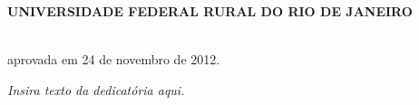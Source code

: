 \documentclass[
	12pt,				%
	openany,			%
	twoside,			%
	a4paper,			%
	chapter=TITLE,		%
	english,			%
	brazil				%
	]{abntex2}
\begin{document}
%
% 
%
\begin{folhadeaprovacao}
    
    \noindent \textbf{UNIVERSIDADE FEDERAL RURAL DO RIO DE JANEIRO \\
    \MakeTextUppercase{\imprimirinstituto} \\
    \MakeTextUppercase{\imprimirprogramapg}}

    \vfill
      
    \begin{center}
        \textbf{\MakeTextUppercase{\imprimirautor}}
    \end{center}

    \vfill
    
    \noindent \imprimirpreambulo
       
    \noindent \imprimirtipotrabalho{} aprovada em 24 de novembro de 2012.

    
    
    \vfill
        
\end{folhadeaprovacao}

\begin{dedicatoria}
   \vspace*{\fill}
   \centering
   \noindent
   \textit{ Insira texto da dedicatória aqui.} \vspace*{\fill}
\end{dedicatoria}
\end{document}
